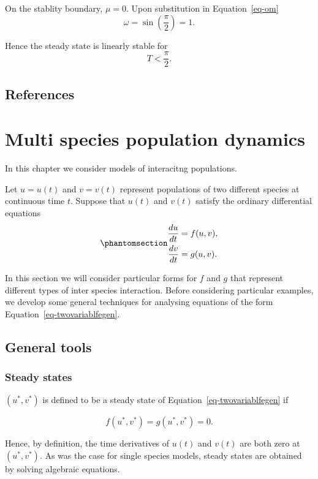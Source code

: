 \documentclass[
  letterpaper,
  DIV=11,
  numbers=noendperiod]{scrreprt}
\begin{document}
On the stablity boundary, \(\mu=0\). Upon substitution in
Equation~\ref{eq-om} \[
\omega = \sin(\frac{\pi}{2})=1.
\]

Hence the steady state is linearly stable for \[
 T< \frac{\pi}{2}.
\]

\section{References}\label{references-1}

\chapter{Multi species population
dynamics}\label{multi-species-population-dynamics}

In this chapter we consider models of interacitng populations.

Let \(u=u(t)\) and \(v=v(t)\) represent populations of two different
species at continuous time \(t\). Suppose that \(u(t)\) and \(v(t)\)
satisfy the ordinary differential equations
\begin{equation}\protect\phantomsection\label{eq-twovariablfegen}{
\begin{aligned}
\frac{du}{dt}&=f(u,v),  \nonumber \\
\frac{dv}{dt}&=g(u,v).
\end{aligned}
}\end{equation}

In this section we will consider particular forms for \(f\) and \(g\)
that represent different types of inter species interaction. Before
considering particular examples, we develop some general techniques for
analysing equations of the form Equation~\ref{eq-twovariablfegen}.

\section{General tools}\label{general-tools}

\subsection{Steady states}\label{steady-states}

\((u^*,v^*)\) is defined to be a steady state of
Equation~\ref{eq-twovariablfegen} if

\[
f(u^*,v^*)=g(u^*,v^*)=0.
\]

Hence, by definition, the time derivatives of \(u(t)\) and \(v(t)\) are
both zero at \((u^*,v^*)\). As was the case for single species models,
steady states are obtained by solving algebraic equations.
\end{document}
